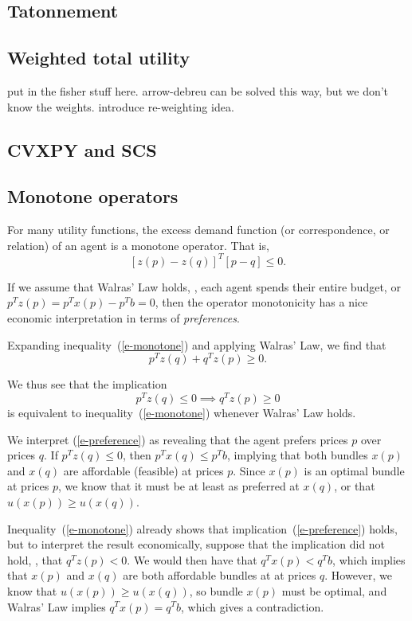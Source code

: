 \documentclass[12pt]{article}
\begin{document}
\subsection{Tatonnement}

\subsection{Weighted total utility}
put in the fisher stuff here. arrow-debreu can be solved this way, but we
don't know the weights. introduce re-weighting idea.

\subsection{CVXPY and SCS}

\subsection{Monotone operators}
For many utility functions,
the excess demand function
(or correspondence,
or relation) of an agent is a
monotone operator.
That is,
\begin{equation}
\label{e-monotone}
\left[z(p) - z(q) \right]^T \left[p - q\right] \leq 0.
\end{equation}

If we assume that Walras' Law holds, \ie, each agent spends their entire
budget, or $p^T z(p) = p^T x(p) - p^T b = 0$, then the operator monotonicity has
a nice economic interpretation in terms of \emph{preferences}.

Expanding inequality~(\ref{e-monotone}) and applying Walras' Law, we find that
\[
p^T z(q) + q^T z(p) \geq 0.
\]

We thus see that the implication
\begin{equation}
\label{e-preference}
p^T z(q) \leq 0 \implies q^T z(p) \geq 0
\end{equation}
is equivalent
to inequality~(\ref{e-monotone}) whenever Walras' Law holds.

We interpret (\ref{e-preference}) as revealing that the agent prefers prices
$p$ over prices $q$. If $p^T z(q) \leq 0$, then $p^T x(q) \leq p^T b$, implying
that both bundles $x(p)$ and $x(q)$ are affordable (feasible) at prices $p$.
Since $x(p)$ is an optimal bundle at prices $p$, we know that it must be at least
as preferred at $x(q)$, or that $u(x(p)) \geq u(x(q))$.

Inequality~(\ref{e-monotone}) already shows that implication~(\ref{e-preference})
holds, but to interpret the result economically, suppose that the
implication did not hold, \ie, that $q^T z(p) < 0$. We would then have that
$q^T x(p) < q^T b$, which implies that $x(p)$ and $x(q)$ are both affordable
bundles at at prices $q$. However, we know that $u(x(p)) \geq u(x(q))$, so
bundle $x(p)$ must be optimal, and Walras' Law implies $q^T x(p) = q^T b$, which
gives a contradiction. 
\end{document}
